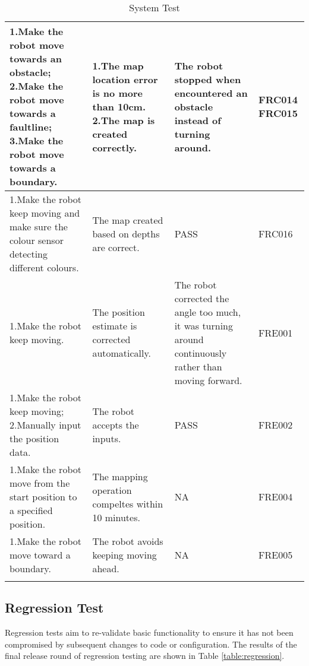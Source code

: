 \documentclass[12pt]{article}
\begin{document}
\begin{longtable}[H]{ | p{}| p{}| p{}|p{}| }
1.Make the robot move towards an obstacle;
2.Make the robot move towards a faultline;
3.Make the robot move towards a boundary.&1.The map location error is no more than 10cm.
2.The map is created correctly.& The robot stopped when encountered an obstacle instead of turning around. &FRC014 FRC015\\
\hline

1.Make the robot keep moving and make sure the colour sensor detecting different colours. &The map created based on depths are correct.& PASS &FRC016\\
\hline

1.Make the robot keep moving. &The position estimate is corrected automatically.& The robot corrected the angle too much, it was turning around continuously rather than moving forward. &FRE001\\
\hline

1.Make the robot keep moving;
2.Manually input the position data.&The robot accepts the inputs.& PASS &FRE002\\
\hline

1.Make the robot move from the start position to a specified position.&The mapping operation compeltes within 10 minutes.&NA&FRE004\\
\hline

1.Make the robot move toward a boundary.&The robot avoids keeping moving ahead.&NA&FRE005\\
\hline
\caption{System Test}\label{table:systemtest}
\end{longtable} 



\subsection{Regression Test}

Regression tests aim to re-validate basic functionality to ensure it has not been compromised by subsequent changes to code or configuration. The results of the final release round of regression testing are shown in Table \ref{table:regression}.
\end{document}
